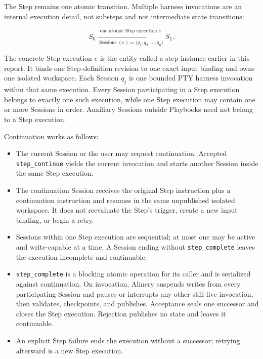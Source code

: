 \documentclass[11pt]{article}
\begin{document}
The Step remains one atomic transition. Multiple harness invocations are an internal execution detail, not substeps and not intermediate state transitions:

\begin{equation}
  S_0
  \xrightarrow[\operatorname{Sessions}(e)=\langle q_1,q_2,\ldots,q_n\rangle]
  {\text{one atomic Step execution }e}
  S_1.
\end{equation}

The concrete Step execution \(e\) is the entity called a step instance earlier in this report. It binds one Step-definition revision to one exact input binding and owns one isolated workspace. Each Session \(q_j\) is one bounded PTY harness invocation within that same execution. Every Session participating in a Step execution belongs to exactly one such execution, while one Step execution may contain one or more Sessions in order. Auxiliary Sessions outside Playbooks need not belong to a Step execution.

Continuation works as follows:

\begin{itemize}
  \item The current Session or the user may request continuation. Accepted \texttt{step\_continue} yields the current invocation and starts another Session inside the same Step execution.
  \item The continuation Session receives the original Step instruction plus a continuation instruction and resumes in the same unpublished isolated workspace. It does not reevaluate the Step's trigger, create a new input binding, or begin a retry.
  \item Sessions within one Step execution are sequential; at most one may be active and write-capable at a time. A Session ending without \texttt{step\_complete} leaves the execution incomplete and continuable.
  \item \texttt{step\_complete} is a blocking atomic operation for its caller and is serialized against continuation. On invocation, Alinery suspends writes from every participating Session and pauses or interrupts any other still-live invocation, then validates, checkpoints, and publishes. Acceptance seals one successor and closes the Step execution. Rejection publishes no state and leaves it continuable.
  \item An explicit Step failure ends the execution without a successor; retrying afterward is a new Step execution.
\end{itemize}
\end{document}
